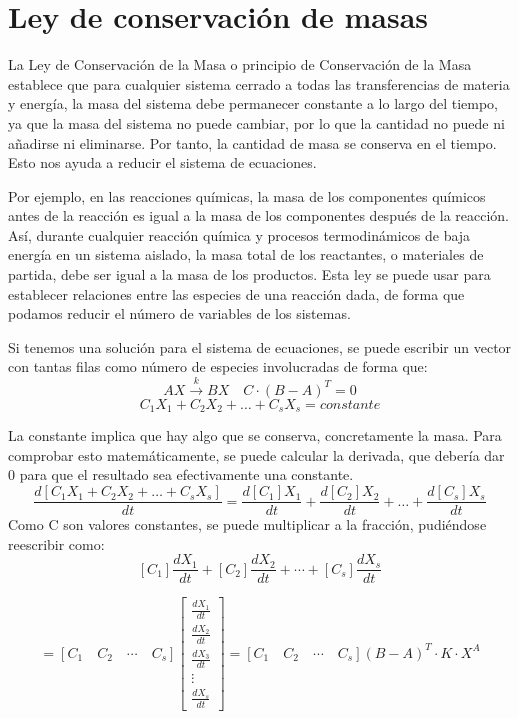 \section{Ley de conservación de masas}
La Ley de Conservación de la Masa o principio de Conservación de la Masa establece que para cualquier sistema cerrado a todas las transferencias de materia y energía, la masa del sistema debe permanecer constante a lo largo del tiempo, ya que la masa del sistema no puede cambiar, por lo que la cantidad no puede ni añadirse ni eliminarse. Por tanto, la cantidad de masa se conserva en el tiempo. Esto nos ayuda a reducir el sistema de ecuaciones. 

Por ejemplo, en las reacciones químicas, la masa de los componentes químicos antes de la reacción es igual a la masa de los componentes después de la reacción. Así, durante cualquier reacción química y procesos termodinámicos de baja energía en un sistema aislado, la masa total de los reactantes, o materiales de partida, debe ser igual a la masa de los productos.
Esta ley se puede usar para establecer relaciones entre las especies de una reacción dada, de forma que podamos reducir el número de variables de los sistemas.

Si tenemos una solución para el sistema de ecuaciones, se puede escribir un vector con tantas filas como número de especies involucradas de forma que:
$$AX \xrightarrow{k} BX \quad C \cdot (B - A)^T = 0$$
$$C_1X_1 + C_2X_2 + \ldots + C_sX_s = constante$$

La constante implica que hay algo que se conserva, concretamente la masa. Para comprobar esto matemáticamente, se puede calcular la derivada, que debería dar 0 para que el resultado sea efectivamente una constante. 
$$\frac{d[C_1X_1 + C_2X_2 + \ldots + C_sX_s]}{dt} = \frac{d[C_1]X_1}{dt} + \frac{d[C_2]X_2}{dt} + \ldots +  \frac{d[C_s]X_s}{dt}$$
Como C son valores constantes, se puede multiplicar a la fracción, pudiéndose reescribir como:
$$[C_1] \frac{dX_1}{dt} + [C_2] \frac{dX_2}{dt} + \cdots + [C_s] \frac{dX_s}{dt}$$

$$= [C_1 \quad C_2 \quad \cdots \quad C_s] \begin{bmatrix}
\frac{dX_1}{dt} \\
\frac{dX_2}{dt} \\
\frac{dX_3}{dt} \\
\vdots \\
\frac{dX_s}{dt}
\end{bmatrix} = [C_1 \quad C_2 \quad \cdots \quad C_s](B-A)^T \cdot K \cdot X^A$$

